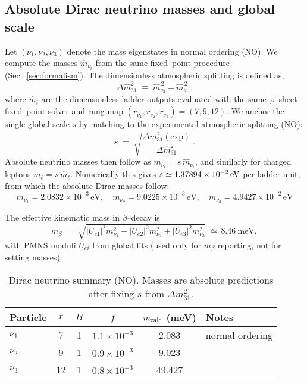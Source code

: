 \documentclass[%
  amsmath,amssymb,
  aps,
 prb,
 floatfix, showkeys
 ]{revtex4-2}
\begin{document}
 \subsection{Absolute Dirac neutrino masses and global scale}
 \label{subsec:nu-absolute}
 Let $(\nu_1,\nu_2,\nu_3)$ denote the mass eigenstates in normal ordering (NO).
 We compute the masses $\widehat m_{\nu_i}$ from the same fixed--point procedure (Sec.~\ref{sec:formalism}).
 The dimensionless atmospheric splitting is defined as, 
 \begin{equation}
   \Delta \widehat m^2_{31} \;\equiv\; \widehat m_{\nu_3}^{\,2} - \widehat m_{\nu_1}^{\,2}\,.
   \label{eq:dimless_atmo}
 \end{equation}
 where $\widehat m_i$ are the dimensionless ladder outputs evaluated with the same
 $\varphi$--sheet fixed--point solver and rung map $(r_{\nu_1},r_{\nu_2},r_{\nu_3})=(7,9,12)$.
 We anchor the single global scale $s$ by matching to the experimental atmospheric splitting (NO):
 \begin{equation}
   s \;=\; \sqrt{\frac{\Delta m^2_{31}(\mathrm{exp})}{\Delta \widehat m^2_{31}}}\,.
   \label{eq:nu_global_scale}
 \end{equation}
 Absolute neutrino masses then follow as $m_{\nu_i}=s\,\widehat m_{\nu_i}$, and
 similarly for charged leptons $m_\ell=s\,\widehat m_\ell$.
  Numerically this gives
 $s \simeq 1.37894\times10^{-2}\,\rm eV$ per ladder unit, from which the absolute Dirac masses follow:
 \[
 m_{\nu_1}=2.0832\times10^{-3}\,\text{eV},\quad
 m_{\nu_2}=9.0225\times10^{-3}\,\text{eV},\quad
 m_{\nu_3}=4.9427\times10^{-2}\,\text{eV}
 \]
 
 The effective kinematic mass in $\beta$–decay is
 \begin{equation}
   m_\beta \;=\; \sqrt{|U_{e1}|^2 m_{\nu_1}^2 + |U_{e2}|^2 m_{\nu_2}^2 + |U_{e3}|^2 m_{\nu_3}^2}\,\,\simeq\,8.46~\text{meV},
   \label{eq:mbeta_def}
 \end{equation}
 with PMNS moduli $U_{ei}$ from global fits \cite{NuFIT52} (used only for $m_\beta$ reporting, not for setting masses).
 \begin{table}[H]
 \caption{Dirac neutrino summary (NO). Masses are absolute predictions after fixing $s$ from $\Delta m^2_{31}$.}
 \label{tab:neutrinos}
 \begin{tabular}{l c c c c l}
 \hline
 Particle & $r$ & $B$ & $f$ & $m_{\rm calc}$ (meV) & Notes \\
 \hline
 $\nu_1$ & 7  & 1 & $1.1\times10^{-3}$ & 2.083 & normal ordering \\
 $\nu_2$ & 9  & 1 & $0.9\times10^{-3}$ & 9.023 &  \\
 $\nu_3$ & 12 & 1 & $0.8\times10^{-3}$ & 49.427 &  \\
 \hline
 \end{tabular}
 \end{table}
 
\end{document}
